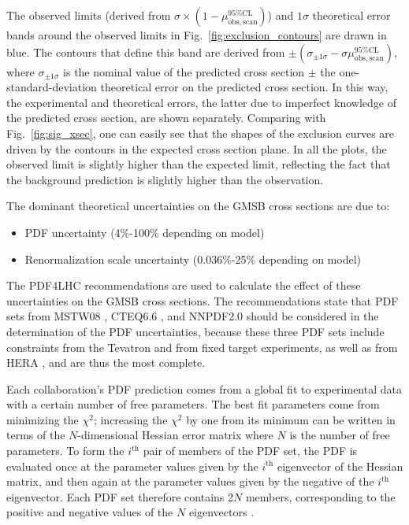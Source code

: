 \documentclass[dissertation.tex]{subfiles}
\begin{document}
The observed limits (derived from $\sigma\times(1 - \mu_{\mathrm{obs,scan}}^{95\%\mathrm{CL}})$) and $1\sigma$ theoretical error bands around the observed limits in Fig.~\ref{fig:exclusion_contours} are drawn in blue.  The contours that define this band are derived from $\pm(\sigma_{\pm1\sigma} - \sigma\mu_{\mathrm{obs,scan}}^{95\%\mathrm{CL}})$, where $\sigma_{\pm1\sigma}$ is the nominal value of the predicted cross section $\pm$ the one-standard-deviation theoretical error on the predicted cross section.  In this way, the experimental and theoretical errors, the latter due to imperfect knowledge of the predicted cross section, are shown separately.  Comparing with Fig.~\ref{fig:sig_xsec}, one can easily see that the shapes of the exclusion curves are driven by the contours in the expected cross section plane.  In all the plots, the observed limit is slightly higher than the expected limit, reflecting the fact that the background prediction is slightly higher than the observation.

The dominant theoretical uncertainties on the GMSB cross sections are due to:

\begin{itemize}
\item PDF uncertainty (4\%-100\% depending on model)
\item Renormalization scale uncertainty (0.036\%-25\% depending on model)
\end{itemize}
%
The PDF4LHC \cite{PDF4LHC} recommendations are used to calculate the effect of these uncertainties on the GMSB cross sections.  The recommendations state that PDF sets from MSTW08 \cite{MSTW08}, CTEQ6.6 \cite{CTEQ6}, and NNPDF2.0 \cite{NNPDF2_0} should be considered in the determination of the PDF uncertainties, because these three PDF sets include constraints from the Tevatron and from fixed target experiments, as well as from HERA \cite{HERA}, and are thus the most complete.

Each collaboration's PDF prediction comes from a global fit to experimental data with a certain number of free parameters.  The best fit parameters come from minimizing the $\chi^{2}$; increasing the $\chi^{2}$ by one from its minimum can be written in terms of the $N$-dimensional Hessian error matrix \cite{Hessian} where $N$ is the number of free parameters.  To form the $i^{\mathrm{th}}$ pair of members of the PDF set, the PDF is evaluated once at the parameter values given by the $i^{\mathrm{th}}$ eigenvector of the Hessian matrix, and then again at the parameter values given by the negative of the $i^{\mathrm{th}}$ eigenvector.  Each PDF set therefore contains 2$N$ members, corresponding to the positive and negative values of the $N$ eigenvectors \cite{PDF_primer}.
\end{document}
